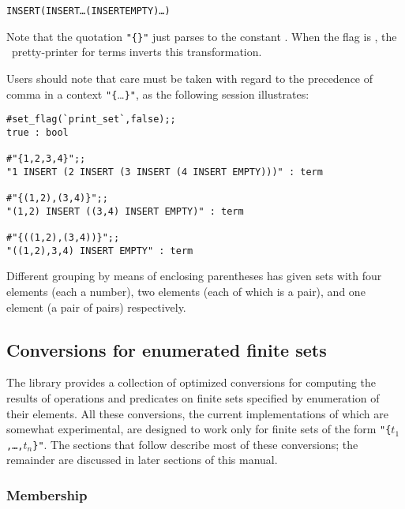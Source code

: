 \begin{hol}
\begin{alltt}
   INSERT  (INSERT  \dots (INSERT  EMPTY)\dots)
\end{alltt}\end{hol}

\noindent Note that the quotation {\small\verb!"{}"!} just parses to the
constant . When the
flag is , the \HOL\ pretty-printer for terms inverts this
transformation.

Users should note that care must be taken with regard to the precedence of
comma in a context {\small\verb!"{!\dots\verb!}"!}, as the following session
illustrates:

\setcounter{sessioncount}{1}
\begin{session}
\begin{verbatim}
#set_flag(`print_set`,false);;
true : bool

#"{1,2,3,4}";;
"1 INSERT (2 INSERT (3 INSERT (4 INSERT EMPTY)))" : term

#"{(1,2),(3,4)}";;
"(1,2) INSERT ((3,4) INSERT EMPTY)" : term

#"{((1,2),(3,4))}";;
"((1,2),3,4) INSERT EMPTY" : term
\end{verbatim}\end{session}

\noindent Different grouping by means of enclosing parentheses has given sets
with four elements (each a number), two elements (each of which is a pair), and
one element (a pair of pairs) respectively.

\subsection{Conversions for enumerated finite sets}

The  library provides a collection of optimized conversions for
computing the results of operations and predicates on finite sets specified by
enumeration of their elements.  All these conversions, the current
implementations of which are somewhat experimental, are designed to work only
for finite sets of the form {\small\verb!"{!\tt$t_1$,\dots,$t_n$\verb!}"!}.
The sections that follow describe most of these conversions; the remainder are
discussed in later sections of this manual.

\subsubsection{Membership}\label{inconv}

